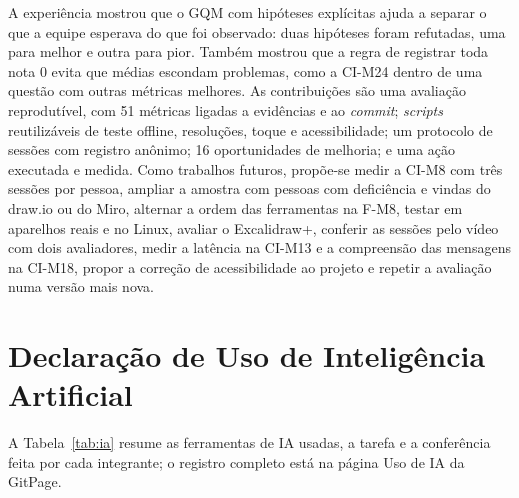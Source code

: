 \documentclass[conference]{IEEEtran}
\begin{document}
A experiência mostrou que o GQM com hipóteses explícitas ajuda a separar o
que a equipe esperava do que foi observado: duas hipóteses foram refutadas,
uma para melhor e outra para pior. Também mostrou que a regra de registrar
toda nota 0 evita que médias escondam problemas, como a CI-M24 dentro de
uma questão com outras métricas melhores. As contribuições são uma avaliação
reprodutível, com 51 métricas ligadas a evidências e ao \textit{commit};
\textit{scripts} reutilizáveis de teste offline, resoluções, toque e
acessibilidade; um protocolo de sessões com registro anônimo; 16
oportunidades de melhoria; e uma ação executada e medida. Como trabalhos
futuros, propõe-se medir a CI-M8 com três sessões por pessoa, ampliar a
amostra com pessoas com deficiência e vindas do draw.io ou do Miro,
alternar a ordem das ferramentas na F-M8, testar em aparelhos reais e no
Linux, avaliar o Excalidraw+, conferir as sessões pelo vídeo com dois
avaliadores, medir a latência na CI-M13 e a compreensão das mensagens na
CI-M18, propor a correção de acessibilidade ao projeto e
repetir a avaliação numa versão mais nova.

\section*{Declaração de Uso de Inteligência Artificial}
A Tabela~\ref{tab:ia} resume as ferramentas de IA usadas, a tarefa e a
conferência feita por cada integrante; o registro completo está na página
Uso de IA da GitPage.
\end{document}

